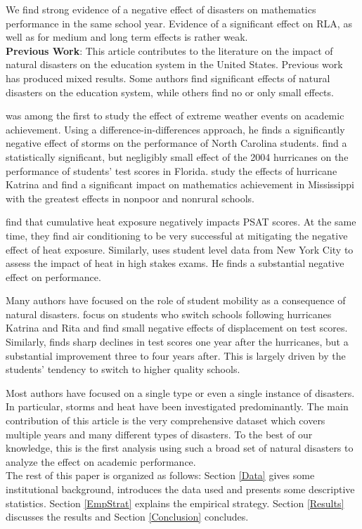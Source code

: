 We find strong evidence of a negative effect of disasters on mathematics performance in the same school year. Evidence of a significant effect on RLA, as well as for medium and long term effects is rather weak.
\\

\textbf{Previous Work}: This article contributes to the literature on the impact of natural disasters on the education system in the United States. Previous work has produced mixed results. Some authors find significant effects of natural disasters on the education system, while others find no or only small effects.

\cite{Holmes_2002} was among the first to study the effect of extreme weather events on academic achievement. Using a difference-in-differences approach, he finds a significantly negative effect of storms on the performance of North Carolina students. \cite{Baggerly_2008} find a statistically significant, but negligibly small effect of the 2004 hurricanes on the performance of students' test scores in Florida. \cite{Lamb_2013} study the effects of hurricane Katrina and find a significant impact on mathematics achievement in Mississippi with the greatest effects in nonpoor and nonrural schools.

\cite{Goodman_2020} find that cumulative heat exposure negatively impacts PSAT scores. At the same time, they find air conditioning to be very successful at mitigating the negative effect of heat exposure. Similarly, \cite{Park_2022} uses student level data from New York City to assess the impact of heat in high stakes exams. He finds a substantial negative effect on performance.

Many authors have focused on the role of student mobility as a consequence of natural disasters. \cite{Pane_2008} focus on students who switch schools following hurricanes Katrina and Rita and find small negative effects of displacement on test scores. Similarly, \cite{Sacerdote_2012} finds sharp declines in test scores one year after the hurricanes, but a substantial improvement three to four years after. This is largely driven by the students' tendency to switch to higher quality schools.

Most authors have focused on a single type or even a single instance of disasters. In particular, storms and heat have been investigated predominantly. The main contribution of this article is the very comprehensive dataset which covers multiple years and many different types of disasters. To the best of our knowledge, this is the first analysis using such a broad set of natural disasters to analyze the effect on academic performance.
\\

The rest of this paper is organized as follows: Section \ref{Data} gives some institutional background, introduces the data used and presents some descriptive statistics. Section \ref{EmpStrat} explains the empirical strategy. Section \ref{Results} discusses the results and Section \ref{Conclusion} concludes.

